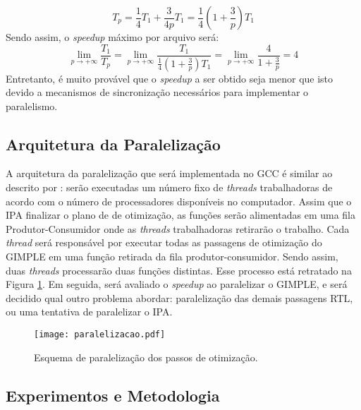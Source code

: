 $$ T_p = \frac{1}{4} T_1 + \frac{3}{4p}T_1 = \frac{1}{4} \left( 1 + \frac{3}{p}
\right)T_1 $$ Sendo assim, o \textit{speedup} máximo por arquivo será: $$
\lim_{p \rightarrow +\infty} \frac{T_1}{T_p} = \lim_{p \rightarrow +\infty}
\frac{T_1}{\frac{1}{4} \left( 1 + \frac{3}{p} \right)T_1} = \lim_{p \rightarrow
+\infty} \frac{4}{1 + \frac{3}{p}} = 4$$
Entretanto, é muito provável que o \textit{speedup} a ser obtido seja menor que isto
devido a mecanismos de sincronização necessários para implementar o paralelismo.

\subsection{Arquitetura da Paralelização}

A arquitetura da paralelização que será implementada no GCC é similar ao
descrito por \cite{wortman1992}: serão executadas um número fixo de
\textit{threads} trabalhadoras de acordo com o número de processadores
disponíveis no computador.
Assim que o IPA finalizar o plano de
de otimização, as funções serão alimentadas em uma fila Produtor-Consumidor
onde as \textit{threads} trabalhadoras retirarão o trabalho.
Cada \textit{thread} será responsável por executar todas as passagens
de otimização do GIMPLE em uma função retirada da fila produtor-consumidor.
Sendo assim, duas \textit{threads} processarão duas funções distintas.
Esse processo está retratado na Figura \ref{fig:paralelizacao}.
Em seguida, será avaliado o \textit{speedup} ao paralelizar o GIMPLE, e
será decidido qual outro problema abordar: paralelização das demais
passagens RTL, ou uma tentativa de paralelizar o IPA.

\begin{figure}[ht]
 \centering
 \texttt{[image: paralelizacao.pdf]}
 \caption{Esquema de paralelização dos passos de otimização.}
 \label{fig:paralelizacao}
\end{figure}
\subsection{Experimentos e Metodologia}

